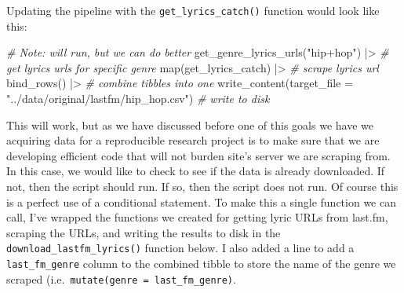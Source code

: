 \documentclass[
  letterpaper,
]{scrbook}
\newenvironment{Shaded}{\begin{snugshade}}{\end{snugshade}}
\newcommand{\AttributeTok}[1]{\textcolor[rgb]{0.00,0.00,0.00}{#1}}
\newcommand{\CommentTok}[1]{\textcolor[rgb]{0.00,0.00,0.00}{\textit{#1}}}
\newcommand{\FunctionTok}[1]{\textcolor[rgb]{0.00,0.00,0.00}{#1}}
\newcommand{\NormalTok}[1]{\textcolor[rgb]{0.00,0.00,0.00}{#1}}
\newcommand{\SpecialCharTok}[1]{\textcolor[rgb]{0.00,0.00,0.00}{#1}}
\newcommand{\StringTok}[1]{\textcolor[rgb]{0.00,0.00,0.00}{#1}}
\begin{document}
Updating the pipeline with the \texttt{get\_lyrics\_catch()} function
would look like this:

\begin{Shaded}
\begin{Highlighting}[]
\CommentTok{\# Note: will run, but we can do better}
\FunctionTok{get\_genre\_lyrics\_urls}\NormalTok{(}\StringTok{"hip+hop"}\NormalTok{) }\SpecialCharTok{|\textgreater{}} \CommentTok{\# get lyrics urls for specific genre}
  \FunctionTok{map}\NormalTok{(get\_lyrics\_catch) }\SpecialCharTok{|\textgreater{}}  \CommentTok{\# scrape lyrics url}
  \FunctionTok{bind\_rows}\NormalTok{() }\SpecialCharTok{|\textgreater{}} \CommentTok{\# combine tibbles into one}
  \FunctionTok{write\_content}\NormalTok{(}\AttributeTok{target\_file =} \StringTok{"../data/original/lastfm/hip\_hop.csv"}\NormalTok{) }\CommentTok{\# write to disk}
\end{Highlighting}
\end{Shaded}

This will work, but as we have discussed before one of this goals we
have we acquiring data for a reproducible research project is to make
sure that we are developing efficient code that will not burden site's
server we are scraping from. In this case, we would like to check to see
if the data is already downloaded. If not, then the script should run.
If so, then the script does not run. Of course this is a perfect use of
a conditional statement. To make this a single function we can call,
I've wrapped the functions we created for getting lyric URLs from
last.fm, scraping the URLs, and writing the results to disk in the
\texttt{download\_lastfm\_lyrics()} function below. I also added a line
to add a \texttt{last\_fm\_genre} column to the combined tibble to store
the name of the genre we scraped
(i.e.~\texttt{mutate(genre\ =\ last\_fm\_genre)}.
\end{document}
